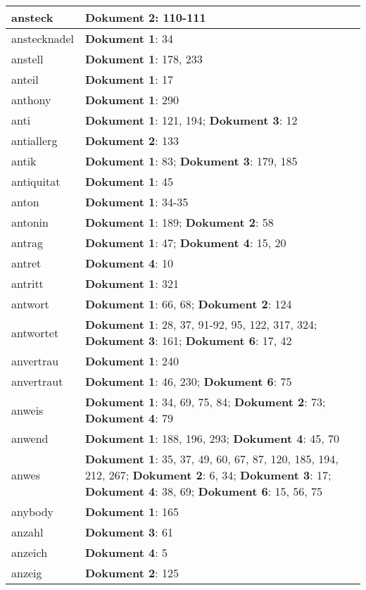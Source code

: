 \documentclass[a5paper]{article}
\begin{document}
\begin{longtable}[l]{|l|p{3in}|}
\hline
ansteck & \textbf{Dokument 2}: 110-111 \\
\hline
anstecknadel & \textbf{Dokument 1}: 34 \\
\hline
anstell & \textbf{Dokument 1}: 178, 233 \\
\hline
anteil & \textbf{Dokument 1}: 17 \\
\hline
anthony & \textbf{Dokument 1}: 290 \\
\hline
anti & \textbf{Dokument 1}: 121, 194; \textbf{Dokument 3}: 12 \\
\hline
antiallerg & \textbf{Dokument 2}: 133 \\
\hline
antik & \textbf{Dokument 1}: 83; \textbf{Dokument 3}: 179, 185 \\
\hline
antiquitat & \textbf{Dokument 1}: 45 \\
\hline
anton & \textbf{Dokument 1}: 34-35 \\
\hline
antonin & \textbf{Dokument 1}: 189; \textbf{Dokument 2}: 58 \\
\hline
antrag & \textbf{Dokument 1}: 47; \textbf{Dokument 4}: 15, 20 \\
\hline
antret & \textbf{Dokument 4}: 10 \\
\hline
antritt & \textbf{Dokument 1}: 321 \\
\hline
antwort & \textbf{Dokument 1}: 66, 68; \textbf{Dokument 2}: 124 \\
\hline
antwortet & \textbf{Dokument 1}: 28, 37, 91-92, 95, 122, 317, 324; \textbf{Dokument 3}: 161; \textbf{Dokument 6}: 17, 42 \\
\hline
anvertrau & \textbf{Dokument 1}: 240 \\
\hline
anvertraut & \textbf{Dokument 1}: 46, 230; \textbf{Dokument 6}: 75 \\
\hline
anweis & \textbf{Dokument 1}: 34, 69, 75, 84; \textbf{Dokument 2}: 73; \textbf{Dokument 4}: 79 \\
\hline
anwend & \textbf{Dokument 1}: 188, 196, 293; \textbf{Dokument 4}: 45, 70 \\
\hline
anwes & \textbf{Dokument 1}: 35, 37, 49, 60, 67, 87, 120, 185, 194, 212, 267; \textbf{Dokument 2}: 6, 34; \textbf{Dokument 3}: 17; \textbf{Dokument 4}: 38, 69; \textbf{Dokument 6}: 15, 56, 75 \\
\hline
anybody & \textbf{Dokument 1}: 165 \\
\hline
anzahl & \textbf{Dokument 3}: 61 \\
\hline
anzeich & \textbf{Dokument 4}: 5 \\
\hline
anzeig & \textbf{Dokument 2}: 125 \\

\end{longtable}
\end{document}
